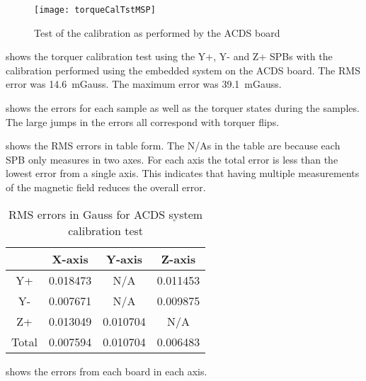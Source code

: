 \begin{figure}[!ht]
    \centering
    \texttt{[image: torqueCalTstMSP]}
    \caption{Test of the calibration as performed by the \ac{ACDS} board}
    \label{fig:tcalMSP}
\end{figure}

 shows the torquer calibration test using the Y+, Y- and Z+ \acp{SPB} with the calibration performed using the embedded system on the \ac{ACDS} board. The RMS error was 14.6~mGauss. The maximum error was 39.1~mGauss.


 shows the errors for each sample as well as the torquer states during the samples. The large jumps in the errors all correspond with torquer flips.

 shows the RMS errors in table form. The N/As in the table are because each \ac{SPB} only measures in two axes. For each axis the total error is less than the lowest error from a single axis. This indicates that having multiple measurements of the magnetic field reduces the overall error.

\begin{table}[!htb]
    \centering
    \caption{RMS errors in Gauss for \ac{ACDS} system calibration test}
    \label{tab:tcalMSPerr}
    \begin{tabular}{|c|c|c|c|}
        \hline
        &X-axis&Y-axis&Z-axis\\
        \hline
        Y+&0.018473&N/A&0.011453\\
        \hline
        Y-&0.007671&N/A&0.009875\\
        \hline
        Z+&0.013049&0.010704&N/A\\
        \hline
        Total&0.007594&0.010704&0.006483\\
        \hline
    \end{tabular}
\end{table}

 shows the errors from each board in each axis.

